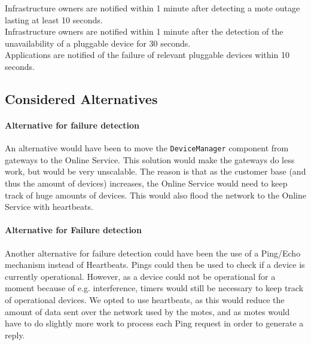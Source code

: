             Infrastructure owners are notified within 1 minute after detecting a mote outage lasting at
            least 10 seconds. \\
            Infrastructure owners are notified within 1 minute after the detection of the unavailability of
            a pluggable device for 30 seconds. \\
            Applications are notified of the failure of relevant pluggable devices within 10 seconds.

        

    \subsection*{Considered Alternatives}
        \paragraph{Alternative for failure detection}
            An alternative would have been to move the \texttt{DeviceManager}
            component from gateways to the Online Service. This solution would make the
            gateways do less work, but would be very unscalable. The reason is
            that as the customer base (and thus the amount of devices) increases,
            the Online Service would need to keep track of huge amounts of devices.
            This would also flood the network to the Online Service with heartbeats.

        \paragraph{Alternative for Failure detection}
            Another alternative for failure detection could have been the use of
            a Ping/Echo mechanism instead of Heartbeats. Pings could then be used
            to check if a device is currently operational. However, as a device could
            not be operational for a moment because of e.g. interference, timers
            would still be necessary to keep track of operational devices. We opted
            to use heartbeats, as this would reduce the amount of data sent over
            the network used by the motes, and as motes would have to do slightly
            more work to process each Ping request in order to generate a reply.

